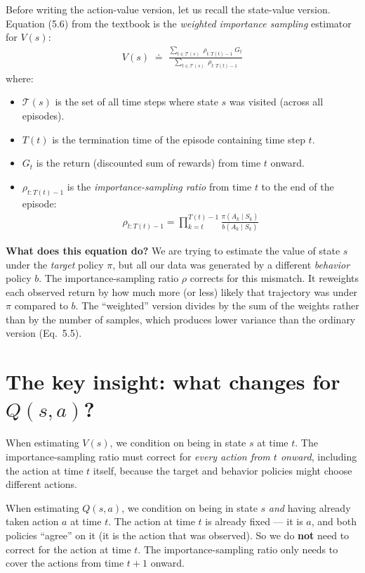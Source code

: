 \documentclass[11pt]{article}
\begin{document}
Before writing the action-value version, let us recall the state-value version. Equation (5.6) from the textbook is the \textit{weighted importance sampling} estimator for $V(s)$:
\begin{align}
    V(s) \;\doteq\; \frac{\displaystyle\sum_{t \in \mathcal{T}(s)}\; \rho_{t:T(t)-1}\; G_t}{\displaystyle\sum_{t \in \mathcal{T}(s)}\; \rho_{t:T(t)-1}} \label{eq:wis_v}
\end{align}
where:
\begin{itemize}[nosep]
    \item $\mathcal{T}(s)$ is the set of all time steps where state $s$ was visited (across all episodes).
    \item $T(t)$ is the termination time of the episode containing time step $t$.
    \item $G_t$ is the return (discounted sum of rewards) from time $t$ onward.
    \item $\rho_{t:T(t)-1}$ is the \textit{importance-sampling ratio} from time $t$ to the end of the episode:
    \begin{align}
        \rho_{t:T(t)-1} = \prod_{k=t}^{T(t)-1} \frac{\pi(A_k \mid S_k)}{b(A_k \mid S_k)}
    \end{align}
\end{itemize}

\textbf{What does this equation do?} We are trying to estimate the value of state $s$ under the \textit{target} policy $\pi$, but all our data was generated by a different \textit{behavior} policy $b$. The importance-sampling ratio $\rho$ corrects for this mismatch. It reweights each observed return by how much more (or less) likely that trajectory was under $\pi$ compared to $b$. The ``weighted'' version divides by the sum of the weights rather than by the number of samples, which produces lower variance than the ordinary version (Eq.~5.5).

\section*{The key insight: what changes for $Q(s, a)$?}

When estimating $V(s)$, we condition on being in state $s$ at time $t$. The importance-sampling ratio must correct for \textit{every action from $t$ onward}, including the action at time $t$ itself, because the target and behavior policies might choose different actions.

When estimating $Q(s, a)$, we condition on being in state $s$ \textit{and} having already taken action $a$ at time $t$. The action at time $t$ is already fixed --- it is $a$, and both policies ``agree'' on it (it is the action that was observed). So we do \textbf{not} need to correct for the action at time $t$. The importance-sampling ratio only needs to cover the actions from time $t + 1$ onward.
\end{document}
